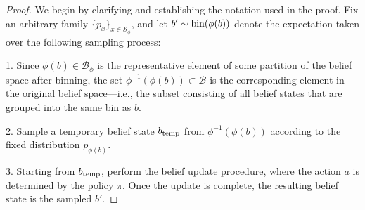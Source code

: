 \documentclass[twoside]{article}
\newcommand{\CAL}[1]{\mathcal{#1}}
\begin{document}
    \begin{proof}
    We begin by clarifying and establishing the notation used in the proof. Fix an arbitrary family $\{p_x\}_{x\in\CAL{S}_\phi}$, and let $b' \sim {\rm bin}(\phi(b))$ denote the expectation taken over the following sampling process:

1. Since $\phi(b) \in \CAL{B}_\phi$ is the representative element of some partition of the belief space after binning, the set $\phi^{-1}(\phi(b)) \subset \CAL{B}$ is the corresponding element in the original belief space—i.e., the subset consisting of all belief states that are grouped into the same bin as $b$.

2. Sample a temporary belief state $b_{\rm temp}$ from $\phi^{-1}(\phi(b))$ according to the fixed distribution $p_{\phi(b)}$.

3. Starting from $b_{\rm temp}$, perform the belief update procedure, where the action $a$ is determined by the policy $\pi$. Once the update is complete, the resulting belief state is the sampled $b'$.


\end{proof}
\end{document}
